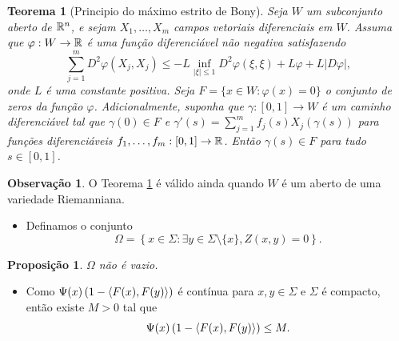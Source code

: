 \documentclass[12pt,a4paper]{beamer}
\newtheorem{teorema}{Teorema}
\newtheorem{proposicao}{Proposição}
\theoremstyle{definition}
\newtheorem{observacao}{Observação}
\begin{document}
\begin{frame}

	\begin{teorema}[Principio do máximo estrito de Bony]
		\label{bony's-strict-maximum-principe}
		Seja $W$ um subconjunto aberto de $\mathbb R^n$, e sejam $X_1, \ldots, X_m$ campos vetoriais diferenciais em $W$. Assuma que $\varphi: W \rightarrow \mathbb R$ é uma função diferenciável não negativa satisfazendo
		\begin{equation*}
			\sum_{j=1}^{m} D^2 \varphi (X_j,X_j) \leq -L \inf_{|\xi| \leq 1} D^2 \varphi(\xi,\xi) + L \varphi + L |D \varphi|,
		\end{equation*}
		onde $L$ é uma constante positiva. Seja $F= \{ x \in W: \varphi(x)=0 \}$ o conjunto de zeros da função $\varphi$. Adicionalmente, suponha que $\gamma: [0,1] \rightarrow W$ é um caminho diferenciável tal que $\gamma(0) \in F$ e $\gamma'(s) = \sum_{j=1}^{m} f_j(s) X_j(\gamma(s))$ para funções diferenciáveis $f_1, \ldots, f_m: [0,1] \rightarrow \mathbb R$. Então $\gamma(s) \in F$ para tudo $s \in [0,1]$.
	\end{teorema}

\end{frame}

\begin{frame}


	\begin{observacao}
		O Teorema \ref{bony's-strict-maximum-principe} é válido ainda quando $W$ é um aberto de uma variedade Riemanniana. 
	\end{observacao}

	\pause

	\begin{itemize}
		\item Definamos o conjunto
		\begin{equation*}
		\Omega = \left\{ x \in \Sigma: \exists y \in \Sigma \setminus \{ x \}, Z(x,y)=0 \right\}.
		\end{equation*}
	\end{itemize}

	\pause
	
	\begin{proposicao}
		$\Omega$ não é vazio.
	\end{proposicao}

	\pause
	
	\begin{itemize}
		\item Como $\Psi(x) \left( 1 - \left\langle F(x),F(y) \right\rangle \right)$ é contínua para $x,y \in \Sigma$ e $\Sigma$ é compacto, então existe $M>0$ tal que
		\begin{equation*}
			\Psi(x) \left( 1 - \left\langle F(x),F(y) \right\rangle \right) \leq M.
		\end{equation*}
		
	\end{itemize}	
		
\end{frame}
\end{document}
